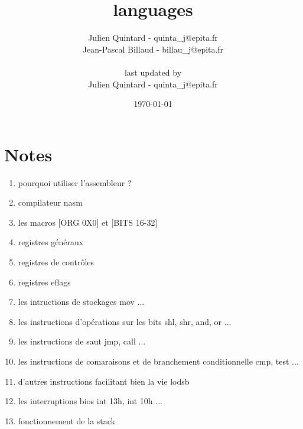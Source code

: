 \documentclass[10pt,a4wide]{article}
\title{languages}
\author{Julien Quintard - \small{quinta\_j@epita.fr} \\
        Jean-Pascal Billaud - \small{billau\_j@epita.fr} \\ \\
	\small{last updated by} \\
	Julien Quintard - \small{quinta\_j@epita.fr}}
\date{\today}
\begin{document}
\maketitle

\section{Notes}

\begin{enumerate}

\item pourquoi utiliser l'assembleur ?
\item compilateur nasm
\item les macros [ORG 0X0] et [BITS 16-32]
\item registres g\'en\'eraux
\item registres de contr\^oles
\item registres eflags
\item les intructions de stockages mov ...
\item les instructions d'op\'erations sur les bits shl, shr, and, or ...
\item les instructions de saut jmp, call ...
\item les instructions de comaraisons et de branchement conditionnelle cmp, test ...
\item d'autres instructions facilitant bien la vie lodsb
\item les interruptions bios int 13h, int 10h ...
\item fonctionnement de la stack

\end{enumerate}
\end{document}
